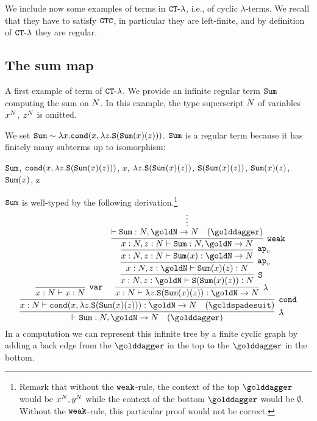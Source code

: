 We include now some examples of  terms in ${ {\tt CT}\mbox{-}\lambda}$, i.e., 
of cyclic $\lambda$-terms. We recall that they have to satisfy ${\tt GTC}$, 
in particular they are left-finite, and by definition of ${ {\tt CT}\mbox{-}\lambda}$ they are regular.


\subsection{The sum map}

A first example of term of  ${ {\tt CT}\mbox{-}\lambda}$. 
We provide an infinite regular term ${\tt Sum}$ computing the sum on ${N}$.
In this example, the type superscript ${N}$ of variables $x^{N}$, $z^{N}$ is omitted.

\begin{Eg}
\label{example-sum}
We set ${\tt Sum} \sim \lambda x.{\tt cond}(x,\lambda z.{\tt S}({\tt Sum}(x)(z)))$.
${\tt Sum}$ is a regular term because it has finitely many subterms up to isomorphism: 
\begin{center}
  ${\tt Sum}$,
  \quad
  ${\tt cond}(x,\lambda z.{\tt S}({\tt Sum}(x)(z)))$,
  \quad
  $x$,
  \quad
  $\lambda z.{\tt S}({\tt Sum}(x)(z))$,
 \quad
  ${\tt S}({\tt Sum}(x)(z))$,
  \quad
  ${\tt Sum}(x)(z)$,
  \quad
  ${\tt Sum}(x)$,
  \quad
   z
\end{center}
${\tt Sum}$ is well-typed by the following derivation.\footnote{Remark that without the 
${\tt weak}$-rule, the context of the top $\golddagger$ would be $x^{N}, y^{N}$ 
while the context of the bottom $\golddagger$ would be $\emptyset$. 
Without the ${\tt weak}$-rule, this particular proof would not be correct.}
\[
\infer[\lambda]{
  \vdash \Sum:\N, 
  \goldN
  \rightarrow \N 
   \quad (\golddagger)
}{
  \infer[\cond]{
    x : \N \vdash 
    \cond(x,\lambda z.\Succ(\Sum(x)(z))): \goldN \rightarrow \N
     \quad (\goldspadesuit)
  }{
    \infer[\var]{
      x : \N \vdash x : \N
    }{}
    &
    \infer[\lambda]{
      x:\N \vdash \lambda z.\Succ(\Sum(x)(z)): \goldN \rightarrow \N  
    }{
      \infer[\Succ]{
        x:\N, z : \goldN 
        \vdash \Succ(\Sum(x)(z)): \N  
      }{
        \infer[\apvar]{
          x:\N, z : \goldN 
          \vdash \Sum(x)(z): \N
        }{
          \infer[\apvar]{
            x:\N,  z : \N
            \vdash \Sum(x): \goldN \rightarrow \N
          }{
            \infer[\weak]{
              x:\N,  z : \N
              \vdash \Sum: \N, \goldN \rightarrow  \N
            }{
              \infer*{\vdash \Sum: \N, \goldN \rightarrow \N 
                \quad (\golddagger)}{}
            }
          }
        }
      }
    }
  }
}
\]
In a computation we can represent this infinite tree by a finite cyclic graph
by adding a back edge from the  $\golddagger$ in the top to the $\golddagger$ in the 
bottom. 
\end{Eg}

